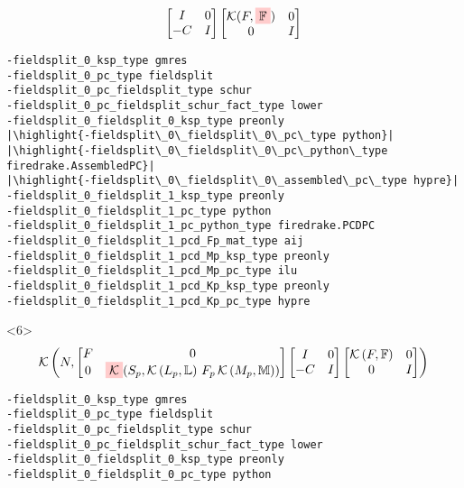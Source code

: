 \documentclass[presentation]{beamer}
\newcommand{\KSP}[2]{\ensuremath{\mathcal{K}\left(#1, \mathbb{#2}\right)}}
\newcommand{\ksp}[1]{\KSP{#1}{#1}}
\newcommand{\highlight}[1]{\colorbox{red!20}{\color{black} #1}}
\begin{document}
\begin{frame}[fragile]
\begin{onlyenv}
\begin{equation*}
{\begin{bmatrix}
        I & 0\\
        -C & I
      \end{bmatrix}
      \begin{bmatrix}
        \mathcal{K}(F, \highlight{$\mathbb{F}$}) & 0 \\
        0 & I
      \end{bmatrix}}
    \end{equation*}
\begin{verbatim}
-fieldsplit_0_ksp_type gmres
-fieldsplit_0_pc_type fieldsplit
-fieldsplit_0_pc_fieldsplit_type schur
-fieldsplit_0_pc_fieldsplit_schur_fact_type lower
-fieldsplit_0_fieldsplit_0_ksp_type preonly
|\highlight{-fieldsplit\_0\_fieldsplit\_0\_pc\_type python}|
|\highlight{-fieldsplit\_0\_fieldsplit\_0\_pc\_python\_type firedrake.AssembledPC}|
|\highlight{-fieldsplit\_0\_fieldsplit\_0\_assembled\_pc\_type hypre}|
-fieldsplit_0_fieldsplit_1_ksp_type preonly
-fieldsplit_0_fieldsplit_1_pc_type python
-fieldsplit_0_fieldsplit_1_pc_python_type firedrake.PCDPC
-fieldsplit_0_fieldsplit_1_pcd_Fp_mat_type aij
-fieldsplit_0_fieldsplit_1_pcd_Mp_ksp_type preonly
-fieldsplit_0_fieldsplit_1_pcd_Mp_pc_type ilu
-fieldsplit_0_fieldsplit_1_pcd_Kp_ksp_type preonly
-fieldsplit_0_fieldsplit_1_pcd_Kp_pc_type hypre
\end{verbatim}
  \end{onlyenv}
  \begin{onlyenv}<6>
    \color{gray}
    \begin{equation*}
      \KSP{N}{%
        \begin{bmatrix}
        F & 0 \\
        0 & \highlight{$\mathcal{K}$}(S_p, \KSP{L_p}{L}\,F_p \, \KSP{M_p}{M})
      \end{bmatrix}
      \begin{bmatrix}
        I & 0\\
        -C & I
      \end{bmatrix}
      \begin{bmatrix}
        \ksp{F} & 0 \\
        0 & I
      \end{bmatrix}}
    \end{equation*}
\begin{verbatim}
-fieldsplit_0_ksp_type gmres
-fieldsplit_0_pc_type fieldsplit
-fieldsplit_0_pc_fieldsplit_type schur
-fieldsplit_0_pc_fieldsplit_schur_fact_type lower
-fieldsplit_0_fieldsplit_0_ksp_type preonly
-fieldsplit_0_fieldsplit_0_pc_type python

\end{verbatim}
\end{onlyenv}
\end{frame}
\end{document}
